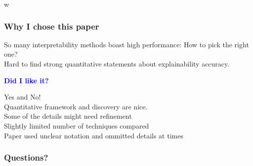 \documentclass{beamer}
\theoremstyle{mystyle}
\begin{document}
w\begin{frame}
\frametitle{Why I chose this paper}\pause
So many interpretability methods boast high performance: How to pick the right one? 
\\
Hard to find strong quantitative statements about explainability accuracy. \pause

\vspace{0.3cm}

    \textcolor{blue}{\textbf{\Large Did I like it?}} \pause
   
    \vspace{0.3cm}

    Yes and No! \\ \pause
    Quantitative framework and discovery are nice. \\ \pause
    Some of the details might need refinement \\ \pause
    Slightly limited number of techniques compared \\
    Paper used unclear notation and ommitted details at times
\end{frame}
\begin{frame}
	\frametitle{Questions?}
\end{frame}
\end{document}

